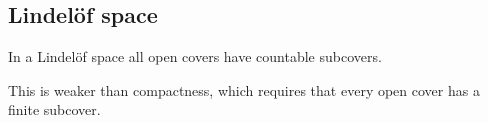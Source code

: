 
\subsection{Lindelöf space}

In a Lindelöf space all open covers have countable subcovers.

This is weaker than compactness, which requires that every open cover has a finite subcover.

